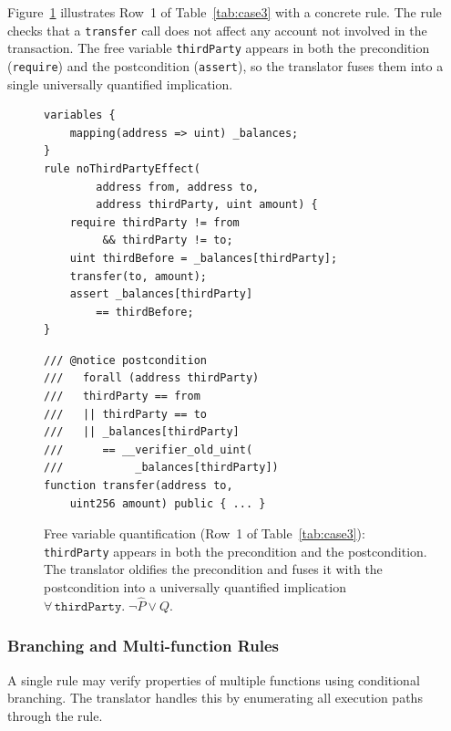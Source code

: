 Figure~\ref{fig:free-var-example} illustrates Row~1 of Table~\ref{tab:case3} with a concrete rule. The rule checks that a \texttt{transfer} call does not affect any account not involved in the transaction. The free variable \texttt{thirdParty} appears in both the precondition (\texttt{require}) and the postcondition (\texttt{assert}), so the translator fuses them into a single universally quantified implication.

\begin{figure}[h]
\centering
\begin{minipage}{0.47\textwidth}
\begin{lstlisting}[style=solstyle]
variables {
    mapping(address => uint) _balances;
}
rule noThirdPartyEffect(
        address from, address to,
        address thirdParty, uint amount) {
    require thirdParty != from
         && thirdParty != to;
    uint thirdBefore = _balances[thirdParty];
    transfer(to, amount);
    assert _balances[thirdParty]
        == thirdBefore;
}
\end{lstlisting}
\end{minipage}
\hfill
\begin{minipage}{0.47\textwidth}
\begin{lstlisting}[style=solstyle]
/// @notice postcondition
///   forall (address thirdParty)
///   thirdParty == from
///   || thirdParty == to
///   || _balances[thirdParty]
///      == __verifier_old_uint(
///           _balances[thirdParty])
function transfer(address to,
    uint256 amount) public { ... }
\end{lstlisting}
\end{minipage}
\caption{Free variable quantification (Row~1 of Table~\ref{tab:case3}): \texttt{thirdParty} appears in both the precondition and the postcondition. The translator oldifies the precondition and fuses it with the postcondition into a universally quantified implication $\forall\,\mathtt{thirdParty}.\;\neg\hat{P} \lor Q$.}
\label{fig:free-var-example}
\end{figure}

\subsubsection{Branching and Multi-function Rules}
\label{sec:branching}

A single rule may verify properties of multiple functions using conditional branching. The translator handles this by enumerating all execution paths through the rule.

